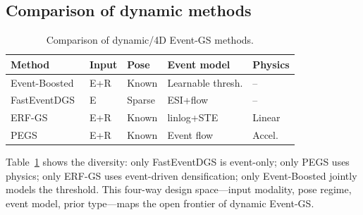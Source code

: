 \subsection{Comparison of dynamic methods}

\begin{table}[t]
\centering
\caption{Comparison of dynamic/4D Event-GS methods.}
\label{tab:dynamic}
\small
\begin{tabular}{@{}p{2.3cm}p{1.1cm}p{1.1cm}p{1.6cm}p{1.0cm}@{}}
\toprule
Method & Input & Pose & Event model & Physics \\
\midrule
Event-Boosted~\cite{xu2025eventboosted} & E+R & Known & Learnable thresh. & -- \\
FastEventDGS~\cite{dai2026fasteventdgs} & E & Sparse & ESI+flow & -- \\
ERF-GS~\cite{bai2026erfgs} & E+R & Known & linlog+STE & Linear \\
PEGS~\cite{xu2025pegs} & E+R & Known & Event flow & Accel. \\
\bottomrule
\end{tabular}
\end{table}

Table~\ref{tab:dynamic} shows the diversity: only FastEventDGS is event-only; only PEGS uses physics; only ERF-GS uses event-driven densification; only Event-Boosted jointly models the threshold. This four-way design space---input modality, pose regime, event model, prior type---maps the open frontier of dynamic Event-GS.
